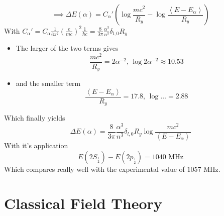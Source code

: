 \documentclass{report}
\begin{document}
\[
  \implies \Delta E\left( \alpha \right) = C_\alpha' \left( \log \frac{mc^2}{R_y} - \log \frac{\left<E- E_\alpha\right>}{R_y}  \right) 
\] With $C_\alpha' = C_\alpha \frac{1}{6\pi^2} \left( \frac{e}{mc} \right) ^2 \frac{1}{\hbar c} = \frac{8}{3 \pi} \frac{\alpha ^{3}}{n^{3}} \delta_{l,0} R_y$
\begin{itemize}
  \item The larger of the two terms gives \[
  \frac{mc^2}{R_y} = 2 \alpha ^{-2} \text{, } \log 2 \alpha ^{-2} \approx 10.53
  \] 
\item and the smaller term \[
\frac{\left<E-E_\alpha\right>}{R_y} = 17.8 \text{, } \log \ldots = 2.88
\] 
\end{itemize}
Which finally yields \[
  \Delta E\left( \alpha \right) = \frac{8}{3\pi} \frac{\alpha ^{3}}{n^{3}} \delta_{l,0} R_y \log \frac{mc^2}{\left<E-E_\alpha\right>}
\] 
With it's application \[
  E\left( 2S_{\frac{1}{2}} \right) - E\left( 2p_{\frac{1}{2}} \right) = 1040 \text{ MHz}
\] Which compares really well with the experimental value of $1057$ MHz.


\chapter{Classical Field Theory}
\end{document}
